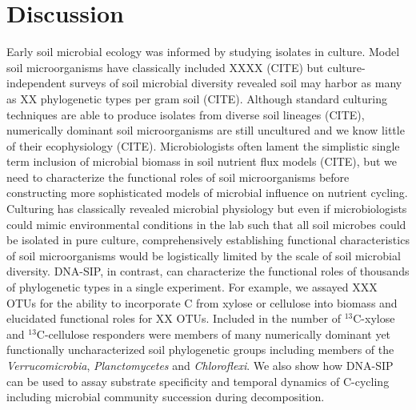 \section{Discussion}
Early soil microbial ecology was informed by studying isolates in culture. 
Model soil microorganisms have classically included  XXXX
(CITE) but culture-independent surveys of soil microbial diversity revealed
soil may harbor as many as XX phylogenetic types per gram soil (CITE). Although
standard culturing techniques are able to produce isolates from diverse soil
lineages (CITE), numerically dominant soil microorganisms are still uncultured
and we know little of their ecophysiology (CITE). Microbiologists
often lament the simplistic single term inclusion of microbial biomass in soil
nutrient flux models (CITE), but we need to characterize the functional roles of
soil microorganisms before constructing more sophisticated models of microbial
influence on nutrient cycling. Culturing has classically revealed microbial
physiology but even if microbiologists could mimic environmental conditions in
the lab such that all soil microbes could be isolated in pure culture,
comprehensively establishing functional characteristics of soil microorganisms
would be logistically limited by the scale of soil microbial diversity.
DNA-SIP, in contrast, can characterize the functional roles of thousands of
phylogenetic types in a single experiment. For example, we assayed XXX
OTUs for the ability to incorporate C from xylose or cellulose into biomass and
elucidated functional roles for XX OTUs. Included in the number of
$^{13}$C-xylose and $^{13}$C-cellulose responders were members of many
numerically dominant yet functionally uncharacterized soil phylogenetic groups
including members of the \textit{Verrucomicrobia}, \textit{Planctomycetes} and
\textit{Chloroflexi}. We also show how DNA-SIP can be used to assay substrate
specificity and temporal dynamics of C-cycling including microbial community
succession during decomposition.

